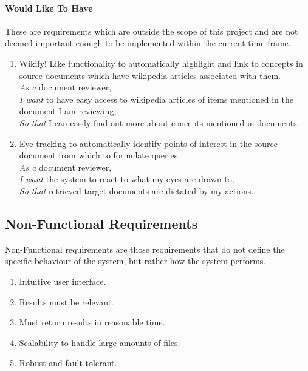 \documentclass{l4proj}
\begin{document}
\paragraph{Would Like To Have}
These are requirements which are outside the scope of this project and are not deemed important enough to be implemented within the current time frame.
\begin{enumerate}[label=\textbf{W.\arabic*}]
\item Wikify! Like functionality to automatically highlight and link to concepts in source documents which have wikipedia articles associated with them. \\
\textit{As a} document reviewer, \\
\textit{I want} to have easy access to wikipedia articles of items mentioned in the document I am reviewing, \\
\textit{So that} I can easily find out more about concepts mentioned in documents.
\item Eye tracking to automatically identify points of interest in the source document from which to formulate queries. \\
\textit{As a} document reviewer, \\
\textit{I want} the system to react to what my eyes are drawn to, \\
\textit{So that} retrieved target documents are dictated by my actions.
\end{enumerate}
\subsection{Non-Functional Requirements}
Non-Functional requirements are those requirements that do not define the specific behaviour of the system, but rather how the system performs.
\begin{enumerate}[label=\textbf{NF.\arabic*}]
\item Intuitive user interface.
\item Results must be relevant.
\item Must return results in reasonable time.
\item Scalability to handle large amounts of files. 
\item Robust and fault tolerant.
\end{enumerate}
\end{document}
